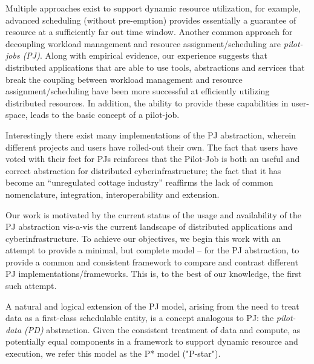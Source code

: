 \documentclass[conference,final]{IEEEtran}
\newcommand{\jhanote}[1]{ {\textcolor{red} { ***shantenu: #1 }}}
\newcommand{\jhanote}[1]{}
\begin{document}
Multiple approaches exist to support dynamic resource utilization, for
example, advanced scheduling (without pre-emption) provides
essentially a guarantee of resource %
at a sufficiently far out time window.  Another common approach for
decoupling workload management and resource assignment/scheduling are
\emph{pilot-jobs (PJ)}. Along with empirical evidence, our experience
suggests that distributed applications that are able to use tools,
abstractions and services that break the coupling between workload
management and resource assignment/scheduling have been more
successful at efficiently utilizing distributed resources. In
addition, the ability to provide these capabilities in user-space,
leads to the basic concept of a pilot-job.


Interestingly there exist many implementations of the PJ
abstraction, wherein different projects and users have rolled-out
their own. The fact that users have voted with their feet for
PJs reinforces that the Pilot-Job is both an useful
and correct abstraction for distributed cyberinfrastructure; the fact
that it has become an ``unregulated cottage industry'' reaffirms the
lack of common nomenclature, integration, interoperability and
extension.

Our work is motivated by the current status of the usage and
availability of the PJ abstraction vis-a-vis the current
landscape of distributed applications and cyberinfrastructure.
To achieve our objectives, we begin this work with an attempt to
provide a minimal, but complete model -- for the PJ
abstraction, to provide a common and consistent framework to compare
and contrast different PJ implementations/frameworks. This is,
to the best of our knowledge, the first such attempt.

A natural and logical extension of the PJ model, arising from the need to treat
data as a first-class schedulable entity, is a concept analogous to PJ: the
\emph{pilot-data (PD)} abstraction. Given the consistent treatment of data and
compute, as potentially equal components in a framework to support dynamic
resource and execution, we refer this model as the P* model ("P-star").
\end{document}
